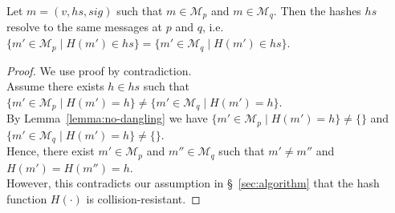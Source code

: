 \documentclass[a4paper,anonymous,USenglish]{lipics-v2019}
\begin{document}
\begin{lemma}\label{lemma:no-collision}
Let $m = (v, \mathit{hs}, \mathit{sig})$ such that $m \in \mathcal{M}_p$ and $m \in \mathcal{M}_q$.
Then the hashes $\mathit{hs}$ resolve to the same messages at $p$ and $q$, i.e.\ $\{m' \in \mathcal{M}_p \mid H(m') \in \mathit{hs}\} = \{m' \in \mathcal{M}_q \mid H(m') \in \mathit{hs}\}$.
\end{lemma}
\begin{proof}
We use proof by contradiction.\\
Assume there exists $h \in \mathit{hs}$ such that $\{m' \in \mathcal{M}_p \mid H(m') = h\} \neq \{m' \in \mathcal{M}_q \mid H(m') = h\}$.\\
By Lemma~\ref{lemma:no-dangling} we have $\{m' \in \mathcal{M}_p \mid H(m') = h\} \neq \{\}$ and $\{m' \in \mathcal{M}_q \mid H(m') = h\} \neq \{\}$.\\
Hence, there exist $m' \in \mathcal{M}_p$ and $m'' \in \mathcal{M}_q$ such that $m' \neq m''$ and $H(m') = H(m'') = h$.\\
However, this contradicts our assumption in \S~\ref{sec:algorithm} that the hash function $H(\cdot)$ is collision-resistant.
\end{proof}
\end{document}

